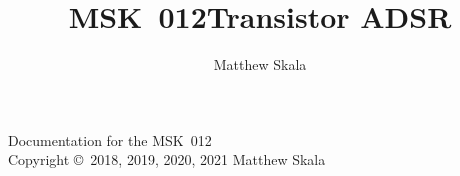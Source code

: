 \documentclass{ncmanual}
\title{MSK~012\quad Transistor ADSR}
\author{Matthew Skala}
\begin{document}
\maketitle


\begin{copyrightpage}
Documentation for the MSK~012\\
Copyright \copyright\ 2018, 2019, 2020, 2021 Matthew Skala

\GPLThreeStatement
\end{copyrightpage}

\tableofcontents











\end{document}
